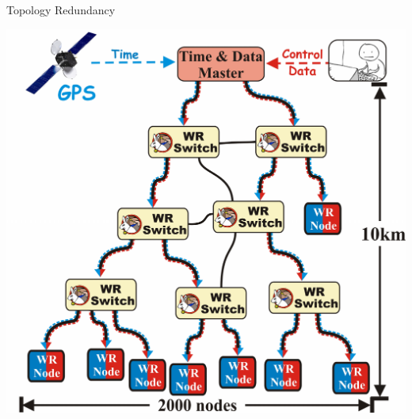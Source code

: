 \documentclass[compress,red]{beamer}
\begin{document}
\subsection{}
\begin{frame}{Topology Redundancy}

      \begin{center}
	\includegraphics[width=.65\textwidth]{network/WR_funny_network.pdf}
      \end{center}

\end{frame}
\end{document}
